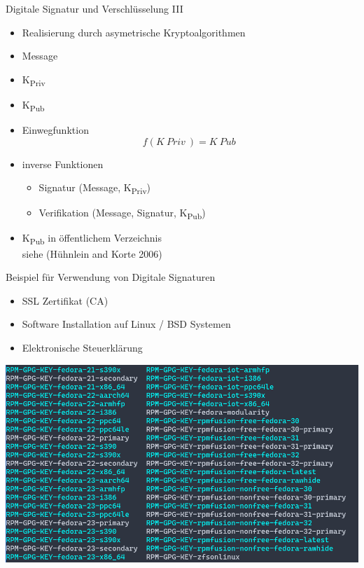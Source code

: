 \documentclass[
  10pt,
  ignorenonframetext,
  aspectratio=169,
]{beamer}
\providecommand{\tightlist}{%
  \setlength{\itemsep}{0pt}\setlength{\parskip}{0pt}}
\begin{document}
\begin{frame}{Digitale Signatur und Verschlüsselung III}
\protect\hypertarget{digitale-signatur-und-verschluxfcsselung-iii}{}
\begin{itemize}
\item
  Realisierung durch asymetrische Kryptoalgorithmen
\item
  Message
\item
  K\textsubscript{Priv}
\item
  K\textsubscript{Pub}
\item
  Einwegfunktion \[f(K~Priv~) = K~Pub~\]
\item
  inverse Funktionen

  \begin{itemize}
  \tightlist
  \item
    Signatur (Message, K\textsubscript{Priv})
  \item
    Verifikation (Message, Signatur, K\textsubscript{Pub})
  \end{itemize}
\item
  K\textsubscript{Pub} in öffentlichem Verzeichnis\\
  siehe (Hühnlein and Korte 2006)
\end{itemize}
\end{frame}

\begin{frame}{Beispiel für Verwendung von Digitale Signaturen}
\protect\hypertarget{beispiel-fuxfcr-verwendung-von-digitale-signaturen}{}
\begin{itemize}
\tightlist
\item
  SSL Zertifikat (CA)
\item
  Software Installation auf Linux / BSD Systemen
\item
  Elektronische Steuerklärung
\end{itemize}

\includegraphics[width=\textwidth,height=0.6\textheight]{Abbildungen/GPG.png}
\end{frame}
\end{document}
